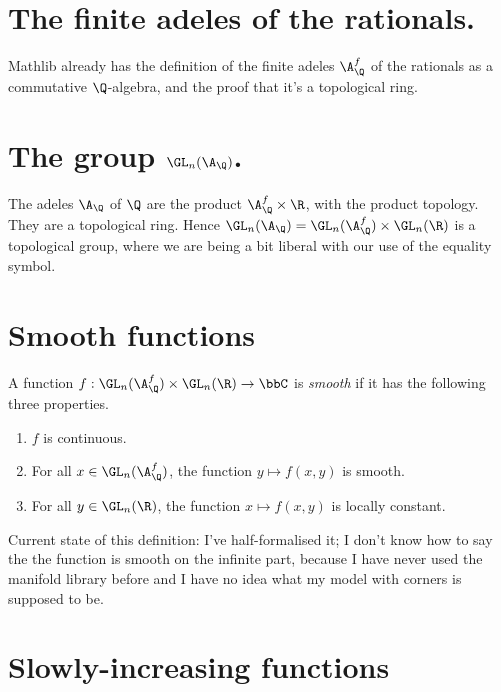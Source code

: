 \section{The finite adeles of the rationals.}

Mathlib already has the definition of the finite adeles $\A_{\Q}^f$ of the rationals as a
commutative $\Q$-algebra, and the proof that it's a topological ring.

\section[The adelic general linear group]{The group $\GL_n(\A_{\Q})$.}

The adeles $\A_{\Q}$ of $\Q$ are the product $\A_{\Q}^f\times\R$, with the product topology.
They are a topological ring. Hence $\GL_n(\A_{\Q})=\GL_n(\A_{\Q}^f)\times\GL_n(\R)$ is a
topological group, where we are being a bit liberal with our use of the equality symbol.

\section{Smooth functions}

\begin{definition}
  \label{AutomorphicForm.GLn.IsSmooth}
  A function $f:\GL_n(\A_{\Q}^f)\times\GL_n(\R)\to\bbC$ is \emph{smooth}
  if it has the following three properties.

  \begin{enumerate}
    \item $f$ is continuous.
    \item For all $x\in\GL_n(\A_{\Q}^f)$, the function $y\mapsto f(x,y)$ is smooth.
    \item For all $y\in\GL_n(\R)$, the function $x\mapsto f(x,y)$ is locally constant.
  \end{enumerate}
\end{definition}

Current state of this definition: I've half-formalised it; I don't know how to say the the
function is smooth on the infinite part, because I have never used the manifold library before
and I have no idea what my model with corners is supposed to be.

\section{Slowly-increasing functions}

